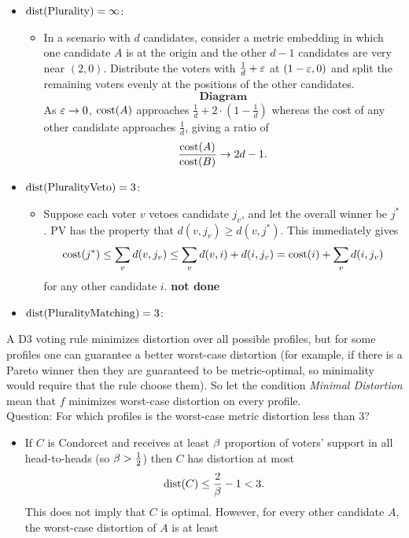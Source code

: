 \documentclass{amsart}
\DeclareMathOperator{\cost}{\rm{cost}}
\DeclareMathOperator{\dist}{\rm{dist}}
\begin{document}
\begin{itemize}
\begin{itemize}
	\end{itemize}
	\item $\dist(\rm{Plurality}) = \infty$:
		\begin{itemize}
		\item In a scenario with $d$ candidates, consider a metric embedding in which one candidate $A$ is at the origin and the other $d-1$ candidates are very near $(2,0)$. Distribute the voters with $\tfrac1d + \varepsilon$ at $(1 - \varepsilon,0)$ and split the remaining voters evenly at the positions of the other candidates.
		$$ \textbf{Diagram}$$
		As $\varepsilon\to 0$, $\cost(A)$ approaches $\tfrac1d + 2\cdot (1-\tfrac1d)$ whereas the cost of any other candidate approaches $\tfrac1d$, giving a ratio of 
		$$
		\frac{\cost(A)}{\cost(B)}\to 2d-1.
		$$
		\end{itemize}
	\item $\dist(\rm{Plurality Veto}) = 3$:
	\begin{itemize}
		\item Suppose each voter $v$ vetoes candidate $j_v$, and let the overall winner be $j^*$. PV has the property that $d(v,j_v)\geq d(v,j^*)$. This immediately gives
		$$
		\cost(j^*) \leq \sum_v d(v,j_v) \leq \sum_v d(v,i) + d(i,j_v) = \cost(i) + \sum_v d(i,j_v)
		$$
		for any other candidate $i$. \textbf{not done}
	\end{itemize}
	\item $\dist(\rm{Plurality Matching})=3$:\\
\end{itemize}

A D3 voting rule minimizes distortion over all possible profiles, but for some profiles one can guarantee a better worst-case distortion (for example, if there is a Pareto winner then they are guaranteed to be metric-optimal, so minimality would require that the rule choose them). So let the condition \textit{Minimal Distortion} mean that $f$ minimizes worst-case distortion on every profile.\\

Question: For which profiles is the worst-case metric distortion less than 3?
\begin{itemize}
	\item If $C$ is Condorcet and receives at least $\beta$ proportion of voters' support in all head-to-heads (so $\beta > \tfrac12$) then $C$ has distortion at most
	$$
	\dist(C)\leq \frac{2}{\b} - 1 < 3.
	$$
	This does not imply that $C$ is optimal. However, for every other candidate $A$, the worst-case distortion of $A$ is at least\\
\end{itemize}
\end{document}
